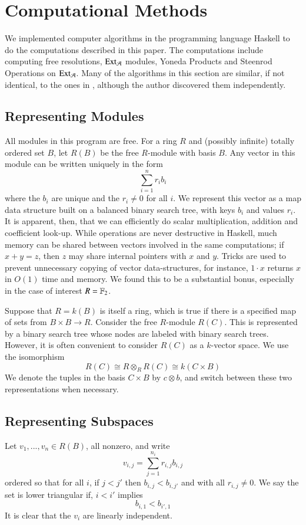 \section{Computational Methods}

We implemented computer algorithms in the programming language Haskell to do the computations described in this paper.
The computations include computing free resolutions, $\operatorname{Ext}\nolimits_{\mathcal{A}}$ modules, Yoneda Products and Steenrod Operations on $\operatorname{Ext}\nolimits_{\mathcal{A}}$.  
Many of the algorithms in this section are similar, if not identical, to the ones in \cite{brunext}, although the author discovered them independently.  


\subsection{Representing Modules}

All modules in this program are free.
For a ring $R$ and (possibly infinite) totally ordered set $B$, let $R(B)$ be the free $R$-module with basis $B$.
Any vector in this module can be written uniquely in the form
\[\sum_{i=1}^n r_ib_i\]
where the $b_i$ are unique and the $r_i\ne 0$ for all $i$.
We represent this vector as a map data structure built on a balanced binary search tree, with keys $b_i$ and values $r_i$.
It is apparent, then, that we can efficiently do scalar multiplication, addition and coefficient look-up.
While operations are never destructive in Haskell, much memory can be shared between vectors involved in the same computations; if $x+y=z$, then $z$ may share internal pointers with $x$ and $y$.  
Tricks are used to prevent unnecessary copying of vector data-structures, for instance, $1\cdot x$ returns $x$ in $O(1)$ time and memory.
We found this to be a substantial bonus, especially in the case of interest $R=\mathbb{F}_2$.

Suppose that $R=k(B)$ is itself a ring, which is true if there is a specified map of sets from $B\times B \to R$.
Consider the free $R$-module $R(C)$.  
This is represented by a binary search tree whose nodes are labeled with binary search trees.
However, it is often convenient to consider $R(C)$ as a $k$-vector space.
We use the isomorphism
\[R(C)\cong R\otimes_R R(C) \cong k(C\times B)\]
We denote the tuples in the basis $C\times B$ by $c\otimes b$, and switch between these two representations when necessary.  

\subsection{Representing Subspaces}
\label{sec:ss}
\begin{Def}
  Let  $v_1,...,v_n\in R(B)$, all nonzero, and write
  \[v_{i,j} = \sum_{j=1}^{n_i} r_{i,j}b_{i,j}\]
  ordered so that for all $i$, if $j<j'$ then $b_{i,j}<b_{i,j'}$ and with all $r_{i,j}\ne 0$.   
  We say the set is lower triangular if, $i<i'$ implies
  \[b_{i,1}<b_{i',1}\]
  It is clear that the $v_i$ are linearly independent.  
\end{Def}

